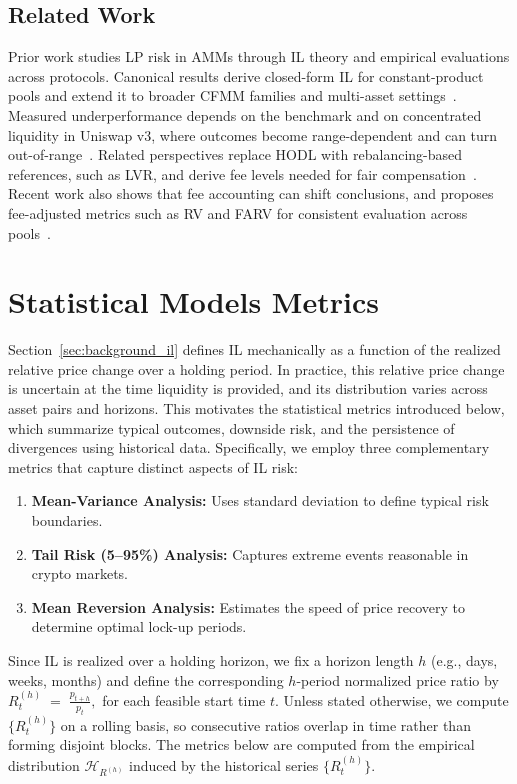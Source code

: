 \documentclass[journal]{IEEEtran}
\begin{document}
\subsection{Related Work}
Prior work studies LP risk in AMMs through IL theory and empirical evaluations across protocols. 
Canonical results derive closed-form IL for constant-product pools and extend it to broader CFMM families and multi-asset settings~\cite{tiruviluamala2022general}. 
Measured underperformance depends on the benchmark and on concentrated liquidity in Uniswap v3, where outcomes become range-dependent and can turn out-of-range~\cite{aigner2021uniswap, loesch2021impermanent, heimbach2022risks}. 
Related perspectives replace HODL with rebalancing-based references, such as LVR, and derive fee levels needed for fair compensation~\cite{milionis2022quantifying, milionis2022automated, cohen2023inefficiency}.
Recent work also shows that fee accounting can shift conclusions, and proposes fee-adjusted metrics such as RV and FARV for consistent evaluation across pools~\cite{roman2025impact, tangri2023generalizing}.



\section{Statistical Models Metrics}
\label{sec:metrics}

Section~\ref{sec:background_il} defines IL mechanically as a function of the realized relative price change over a holding period.
In practice, this relative price change is uncertain at the time liquidity is provided, and its distribution varies across asset pairs and horizons.
This motivates the statistical metrics introduced below, which summarize typical outcomes, downside risk, and the persistence of divergences using historical data.
Specifically, we employ three complementary metrics that capture distinct aspects of IL risk:
\begin{enumerate}
    \item \textbf{Mean-Variance Analysis:} Uses standard deviation to define typical risk boundaries.
    \item \textbf{Tail Risk (5--95\%) Analysis:} Captures extreme events reasonable in crypto markets.
    \item \textbf{Mean Reversion Analysis:} Estimates the speed of price recovery to determine optimal lock-up periods.
\end{enumerate}

Since IL is realized over a holding horizon, we fix a horizon length $h$ (e.g., days, weeks, months) and define the corresponding $h$-period normalized price ratio by
\(
    R^{(h)}_{t} \;=\; \frac{p_{t+h}}{p_t},
\)
for each feasible start time $t$. Unless stated otherwise, we compute $\{R^{(h)}_{t}\}$ on a rolling basis, so consecutive ratios overlap in time rather than forming disjoint blocks. The metrics below are computed from the empirical distribution $\mathcal{H}_{R^{(h)}}$ induced by the historical series $\{R^{(h)}_{t}\}$.
\end{document}

